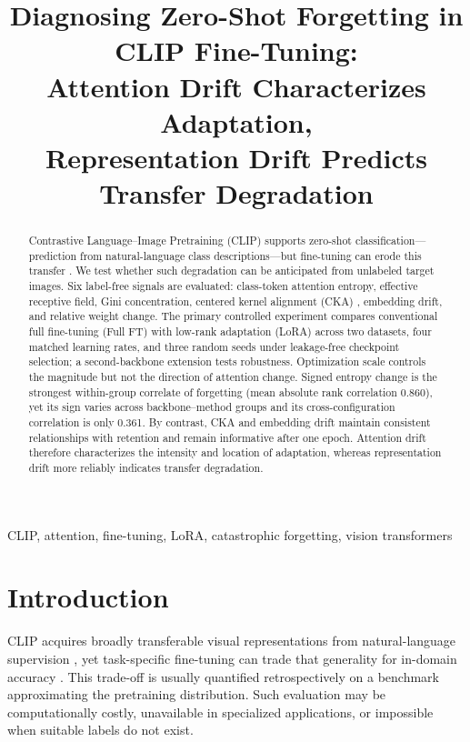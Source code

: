 \documentclass[conference]{IEEEtran}
\title{Diagnosing Zero-Shot Forgetting in CLIP Fine-Tuning:\\
Attention Drift Characterizes Adaptation,\\
Representation Drift Predicts Transfer Degradation}
\author{\IEEEauthorblockN{Ruize Xia}
\IEEEauthorblockA{\textit{High School Student, Nanjing Foreign Language School}\\
Nanjing, Jiangsu, China\\
xiaruize0911@gmail.com}}
\begin{document}
\maketitle

\begin{abstract}
Contrastive Language--Image Pretraining (CLIP) supports zero-shot classification---prediction from natural-language class descriptions---but fine-tuning can erode this transfer \cite{radford2021learning,kumar2022finetuning}. We test whether such degradation can be anticipated from unlabeled target images. Six label-free signals are evaluated: class-token attention entropy, effective receptive field, Gini concentration, centered kernel alignment (CKA) \cite{kornblith2019similarity}, embedding drift, and relative weight change. The primary controlled experiment compares conventional full fine-tuning (Full FT) with low-rank adaptation (LoRA) \cite{hu2022lora} across two datasets, four matched learning rates, and three random seeds under leakage-free checkpoint selection; a second-backbone extension tests robustness. Optimization scale controls the magnitude but not the direction of attention change. Signed entropy change is the strongest within-group correlate of forgetting (mean absolute rank correlation 0.860), yet its sign varies across backbone--method groups and its cross-configuration correlation is only 0.361. By contrast, CKA and embedding drift maintain consistent relationships with retention and remain informative after one epoch. Attention drift therefore characterizes the intensity and location of adaptation, whereas representation drift more reliably indicates transfer degradation.
\end{abstract}

\begin{IEEEkeywords}
CLIP, attention, fine-tuning, LoRA, catastrophic forgetting, vision transformers
\end{IEEEkeywords}

\section{Introduction}
CLIP acquires broadly transferable visual representations from natural-language supervision \cite{radford2021learning}, yet task-specific fine-tuning can trade that generality for in-domain accuracy \cite{kumar2022finetuning}. This trade-off is usually quantified retrospectively on a benchmark approximating the pretraining distribution. Such evaluation may be computationally costly, unavailable in specialized applications, or impossible when suitable labels do not exist.
\end{document}
